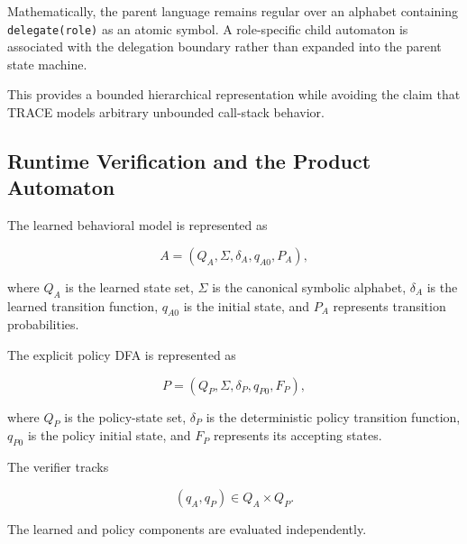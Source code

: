 \documentclass[11pt,a4paper]{article}
\begin{document}
Mathematically, the parent language remains regular over an alphabet containing
\texttt{delegate(role)} as an atomic symbol. A role-specific child automaton is associated
with the delegation boundary rather than expanded into the parent state machine.

This provides a bounded hierarchical representation while avoiding the claim that TRACE
models arbitrary unbounded call-stack behavior.

\subsection{Runtime Verification and the Product Automaton}

The learned behavioral model is represented as

\[
A=(Q_A,\Sigma,\delta_A,q_{A0},P_A),
\]

where $Q_A$ is the learned state set, $\Sigma$ is the canonical symbolic alphabet,
$\delta_A$ is the learned transition function, $q_{A0}$ is the initial state, and
$P_A$ represents transition probabilities.

The explicit policy DFA is represented as

\[
P=(Q_P,\Sigma,\delta_P,q_{P0},F_P),
\]

where $Q_P$ is the policy-state set, $\delta_P$ is the deterministic policy transition
function, $q_{P0}$ is the policy initial state, and $F_P$ represents its accepting
states.

The verifier tracks

\[
(q_A,q_P)\in Q_A\times Q_P.
\]

The learned and policy components are evaluated independently.
\end{document}
